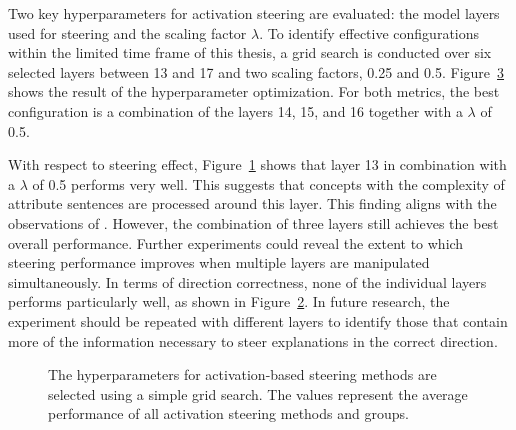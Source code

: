 Two key hyperparameters for activation steering are evaluated: the model layers used for steering and the scaling factor \(\lambda\). To identify effective configurations within the limited time frame of this thesis, a grid search is conducted over six selected layers between \num{13} and \num{17} and two scaling factors, \num{0.25} and \num{0.5}. Figure~\ref{fig:activationSteeringHPO} shows the result of the hyperparameter optimization. For both metrics, the best configuration is a combination of the layers \num{14}, \num{15}, and \num{16} together with a \(\lambda\) of \num{0.5}.

With respect to steering effect, Figure~\ref{fig:activationSteeringHPO:steeringEffect} shows that layer \num{13} in combination with a \(\lambda\) of \num{0.5} performs very well. This suggests that concepts with the complexity of attribute sentences are processed around this layer. This finding aligns with the observations of \citet{konenStyleVectorsSteering2024,bogdanEmergentEffectsScaling2025}. However, the combination of three layers still achieves the best overall performance. Further experiments could reveal the extent to which steering performance improves when multiple layers are manipulated simultaneously. In terms of direction correctness, none of the individual layers performs particularly well, as shown in Figure~\ref{fig:activationSteeringHPO:directionCorrectness}. In future research, the experiment should be repeated with different layers to identify those that contain more of the information necessary to steer explanations in the correct direction.

\begin{figure}[ht]
  \begin{subfigure}[t]{0.49\linewidth}
    \label{fig:activationSteeringHPO:steeringEffect}
  \end{subfigure}
  \hfill
  \begin{subfigure}[t]{0.49\linewidth}
    \label{fig:activationSteeringHPO:directionCorrectness}
  \end{subfigure}
  \caption{The hyperparameters for activation-based steering methods are selected using a simple grid search. The values represent the average performance of all activation steering methods and groups.}%
  \label{fig:activationSteeringHPO}
\end{figure}


